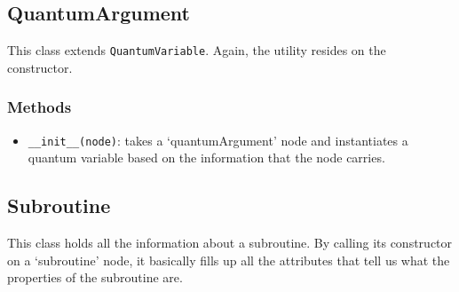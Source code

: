\documentclass[12pt,a4paper]{report}
\theoremstyle{definition}
\theoremstyle{definition}
\theoremstyle{definition}
\begin{document}
\subsection{QuantumArgument}
This class extends \texttt{QuantumVariable}.
Again, the utility resides on the constructor.
\subsubsection{Methods}
\begin{itemize}
    \itemsep 0em
    \item \texttt{\_\_init\_\_(node)}: takes a `quantumArgument' node and instantiates a quantum variable based on the information that the node carries.
\end{itemize}

\subsection{Subroutine}
This class holds all the information about a subroutine. By calling its constructor on a `subroutine' node, it basically fills up all the attributes that tell us what the properties of the subroutine are.
\end{document}
